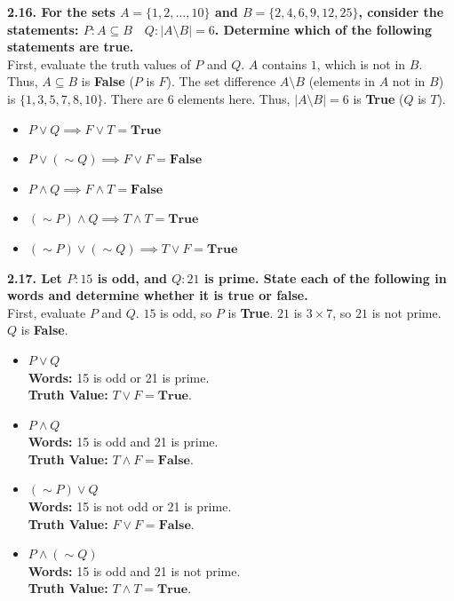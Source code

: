 \documentclass[11pt]{article}
\begin{document}
\vspace{0.5cm}
\textbf{2.16. For the sets $A = \{1, 2, \dots, 10\}$ and $B = \{2, 4, 6, 9, 12, 25\}$, consider the statements: $P: A \subseteq B \quad Q: |A \setminus B| = 6$. Determine which of the following statements are true.} \\
First, evaluate the truth values of $P$ and $Q$.
$A$ contains $1$, which is not in $B$. Thus, $A \subseteq B$ is \textbf{False} ($P$ is $F$).
The set difference $A \setminus B$ (elements in $A$ not in $B$) is $\{1, 3, 5, 7, 8, 10\}$. There are $6$ elements here. Thus, $|A \setminus B| = 6$ is \textbf{True} ($Q$ is $T$).
\begin{itemize}
    \item[(a)] $P \lor Q \implies F \lor T = \textbf{True}$
    \item[(b)] $P \lor (\sim Q) \implies F \lor F = \textbf{False}$
    \item[(c)] $P \land Q \implies F \land T = \textbf{False}$
    \item[(d)] $(\sim P) \land Q \implies T \land T = \textbf{True}$
    \item[(e)] $(\sim P) \lor (\sim Q) \implies T \lor F = \textbf{True}$
\end{itemize}

\vspace{0.5cm}
\textbf{2.17. Let $P: 15$ is odd, and $Q: 21$ is prime. State each of the following in words and determine whether it is true or false.} \\
First, evaluate $P$ and $Q$. $15$ is odd, so $P$ is \textbf{True}. $21$ is $3 \times 7$, so $21$ is not prime. $Q$ is \textbf{False}.
\begin{itemize}
    \item[(a)] $P \lor Q$ \\
    \textbf{Words:} 15 is odd or 21 is prime. \\
    \textbf{Truth Value:} $T \lor F = \textbf{True}$.
    
    \item[(b)] $P \land Q$ \\
    \textbf{Words:} 15 is odd and 21 is prime. \\
    \textbf{Truth Value:} $T \land F = \textbf{False}$.
    
    \item[(c)] $(\sim P) \lor Q$ \\
    \textbf{Words:} 15 is not odd or 21 is prime. \\
    \textbf{Truth Value:} $F \lor F = \textbf{False}$.
    
    \item[(d)] $P \land (\sim Q)$ \\
    \textbf{Words:} 15 is odd and 21 is not prime. \\
    \textbf{Truth Value:} $T \land T = \textbf{True}$.
\end{itemize}
\end{document}
